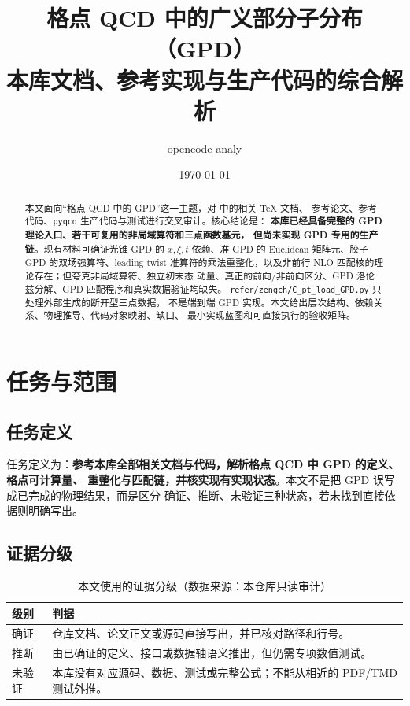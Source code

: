 \documentclass[UTF8]{ctexart}
\title{格点 QCD 中的广义部分子分布（GPD）\\
\large 本库文档、参考实现与生产代码的综合解析}
\author{opencode analy}
\date{\today}
\newcommand{\verified}{\textcolor{struct}{确证}}
\newcommand{\inferred}{\textcolor{relation}{推断}}
\newcommand{\unverified}{\textcolor{warn}{未验证}}
\renewcommand{\path}[1]{\textsf{\detokenize{#1}}}
\begin{document}
\maketitle

\begin{abstract}
本文面向“格点 QCD 中的 GPD”这一主题，对 \path{/root/PyQCD} 中的相关 TeX 文档、
参考论文、参考代码、\texttt{pyqcd} 生产代码与测试进行交叉审计。核心结论是：
\textbf{本库已经具备完整的 GPD 理论入口、若干可复用的非局域算符和三点函数基元，
但尚未实现 GPD 专用的生产链}。现有材料可确证光锥 GPD 的
$x,\xi,t$ 依赖、准 GPD 的 Euclidean 矩阵元、胶子 GPD 的双场强算符、leading-twist
准算符的乘法重整化，以及非前行 NLO 匹配核的理论存在；但夸克非局域算符、独立初末态
动量、真正的前向/非前向区分、GPD 洛伦兹分解、GPD 匹配程序和真实数据验证均缺失。
\texttt{refer/zengch/C\_pt\_load\_GPD.py} 只处理外部生成的断开型三点数据，
不是端到端 GPD 实现。本文给出层次结构、依赖关系、物理推导、代码对象映射、缺口、
最小实现蓝图和可直接执行的验收矩阵。
\end{abstract}

\tableofcontents

\section{任务与范围}

\subsection{任务定义}

任务定义为：\textbf{参考本库全部相关文档与代码，解析格点 QCD 中 GPD 的定义、格点可计算量、
重整化与匹配链，并核实现有实现状态}。本文不是把 GPD 误写成已完成的物理结果，而是区分
\verified、\inferred、\unverified 三种状态，若未找到直接依据则明确写出。

\subsection{证据分级}

\begin{table}[htbp]
\centering
\small
\begin{tabularx}{\textwidth}{lX}
\toprule
\textcolor{struct}{级别} & \textcolor{struct}{判据} \\
\midrule
\verified & 仓库文档、论文正文或源码直接写出，并已核对路径和行号。 \\
\inferred & 由已确证的定义、接口或数据轴语义推出，但仍需专项数值测试。 \\
\unverified & 本库没有对应源码、数据、测试或完整公式；不能从相近的 PDF/TMD 测试外推。 \\
\bottomrule
\end{tabularx}
\caption{本文使用的证据分级（数据来源：本仓库只读审计）}
\end{table}
\end{document}

